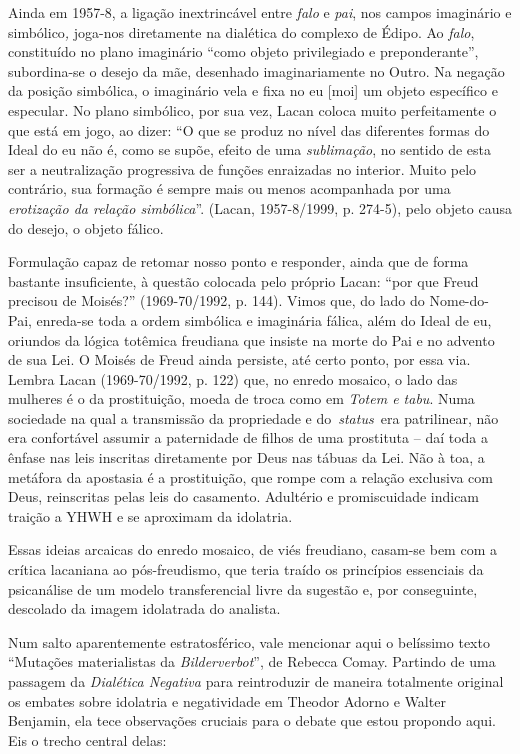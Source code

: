 Ainda em 1957-8, a ligação inextrincável entre \emph{falo} e \emph{pai},
nos campos imaginário e simbólico\emph{,} joga-nos diretamente na
dialética do complexo de Édipo. Ao \emph{falo}, constituído no plano
imaginário ``como objeto privilegiado e preponderante'', subordina-se o
desejo da mãe, desenhado imaginariamente no Outro. Na negação da posição
simbólica, o imaginário vela e fixa no eu {[}moi{]} um objeto específico
e especular. No plano simbólico, por sua vez, Lacan coloca muito
perfeitamente o que está em jogo, ao dizer: ``O que se produz no nível
das diferentes formas do Ideal do eu não é, como se supõe, efeito de uma
\emph{sublimação}, no sentido de esta ser a neutralização progressiva de
funções enraizadas no interior. Muito pelo contrário, sua formação é
sempre mais ou menos acompanhada por uma \emph{erotização da relação
simbólica}''. (Lacan, 1957-8/1999, p. 274-5), pelo objeto causa do
desejo, o objeto fálico.

Formulação capaz de retomar nosso ponto e responder, ainda que de forma
bastante insuficiente, à questão colocada pelo próprio Lacan: ``por que
Freud precisou de Moisés?'' (1969-70/1992, p. 144). Vimos que, do lado
do Nome-do-Pai, enreda-se toda a ordem simbólica e imaginária fálica,
além do Ideal de eu, oriundos da lógica totêmica freudiana que insiste
na morte do Pai e no advento de sua Lei. O Moisés de Freud ainda
persiste, até certo ponto, por essa via. Lembra Lacan (1969-70/1992, p.
122) que, no enredo mosaico, o lado das mulheres é o da prostituição,
moeda de troca como em \emph{Totem e tabu}. Numa sociedade na qual a
transmissão da propriedade e do~\emph{status~}era patrilinear, não era
confortável assumir a paternidade de filhos de uma prostituta -- daí
toda a ênfase nas leis inscritas diretamente por Deus nas tábuas da Lei.
Não à toa, a metáfora da apostasia é a prostituição, que rompe com a
relação exclusiva com Deus, reinscritas pelas leis do casamento.
Adultério e promiscuidade indicam traição a YHWH e se aproximam da
idolatria.

Essas ideias arcaicas do enredo mosaico, de viés freudiano, casam-se bem
com a crítica lacaniana ao pós-freudismo, que teria traído os princípios
essenciais da psicanálise de um modelo transferencial livre da sugestão
e, por conseguinte, descolado da imagem idolatrada do analista.

Num salto aparentemente estratosférico, vale mencionar aqui o belíssimo
texto ``Mutações materialistas da \emph{Bilderverbot}'', de Rebecca
Comay. Partindo de uma passagem da \emph{Dialética Negativa} para
reintroduzir de maneira totalmente original os embates sobre idolatria e
negatividade em Theodor Adorno e Walter Benjamin, ela tece observações
cruciais para o debate que estou propondo aqui. Eis o trecho central
delas:

